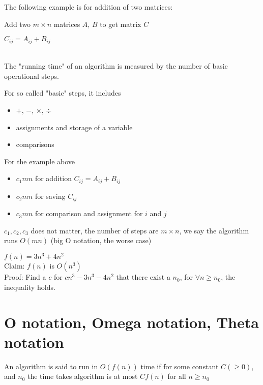 			The following example is for addition of two matrices: \\
			\begin{algorithm}[!ht]
				\caption{Add two $m \times n$ matrices $A$, $B$ to get matrix $C$}
				\begin{algorithmic}
							\STATE $C_{ij} = A_{ij} + B_{ij}$
						\ENDFOR
					\ENDFOR
				\end{algorithmic}				
			\end{algorithm}\\

			The "running time" of an algorithm is measured by the number of basic operational steps.

			For so called "basic" steps, it includes
			\begin{itemize}
				\item $+$, $-$, $\times$, $\div$
				\item assignments and storage of a variable
				\item comparisons
			\end{itemize}

			For the example above
			\begin{itemize}
				\item $c_1 m n$ for addition $C_{ij} = A_{ij} + B_{ij}$
				\item $c_2 m n$ for saving $C_{ij}$
				\item $c_3 m n$ for comparison and assignment for $i$ and $j$
			\end{itemize}
			$c_1, c_2, c_3$ does not matter, the number of steps are $m \times n$, we say the algorithm runs $O(mn)$ (big O notation, the worse case)

			\begin{example}
				$f(n) = 3n^3 + 4n^2$\\
				Claim: $f(n)$ is $O(n^3)$\\
				Proof: Find a $c$ for $cn^3 - 3n^3 - 4n^2$ that there exist a $n_0$, for $\forall n \ge n_0$, the inequality holds.
			\end{example}

		\section{O notation, Omega notation, Theta notation}
			\begin{definition}[O notation]
				An algorithm is said to run in $O(f(n))$ time if for some constant $C (\ge 0)$, and $n_0$ the time takes algorithm is at most $Cf(n)$ for all $n\ge n_0$ 
			\end{definition}

